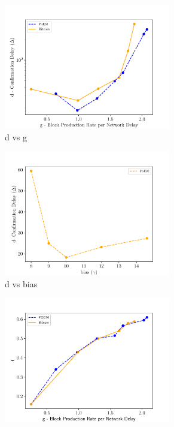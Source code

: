 \begin{figure}
    \centering
    \begin{subfigure}{0.49\textwidth}
    \centering
    \includegraphics[width = 0.8\textwidth]{figures/dvsg.pdf}
    \caption{d vs g}
    \label{fig:dvsg}
    \end{subfigure}
    \begin{subfigure}{0.49\textwidth}
    \centering
    \includegraphics[width = 0.8\textwidth]{figures/gamma.pdf}
    \caption{d vs bias}
    \label{fig:bias}
    \end{subfigure}
    \begin{subfigure}{0.49\textwidth}
    \centering
    \includegraphics[width = 0.8\textwidth]{figures/fvg.pdf}

\end{subfigure}
\end{figure}
